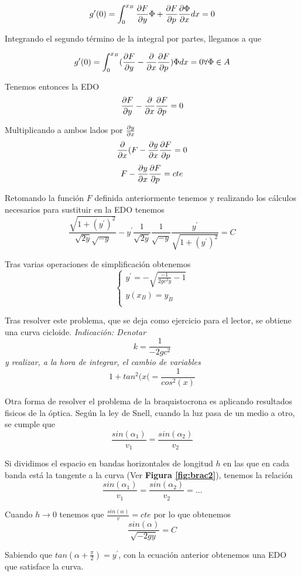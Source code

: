 \begin{example}[(Braquistocrona I)]
$$g^\prime(0) = \int_0^{x_B} \partialder{y}{F}\Phi + \partialder{p}{F}\partialder{x}{\Phi}dx = 0$$

Integrando el segundo término de la integral por partes, llegamos a que

$$g^\prime(0) = \int_0^{x_B} (\partialder{y}{F}-\derivative{x}\partialder{p}{F})\Phi dx = 0 \forall \Phi\in A$$

Tenemos entonces la EDO
$$\partialder{y}{F}-\derivative{x}\partialder{p}{F} = 0$$

Multiplicando a ambos lados por $\partialder{x}{y}$
$$\derivative{x}(F-\partialder{x}{y}\partialder{p}{F} = 0$$
$$F-\partialder{x}{y}\partialder{p}{F} = cte$$

Retomando la función $F$ definida anteriormente tenemos y realizando los cálculos necesarios para sustituir en la EDO tenemos
$$\frac{\sqrt{1+(y^\prime)^2}}{\sqrt{2y}\sqrt{-y}}-y^\prime\frac{1}{\sqrt{2y}}\frac{1}{\sqrt{-y}}\frac{y^\prime}{\sqrt{1+(y^\prime)^2}}=C$$

Tras varias operaciones de simplificación obtenemos
\begin{equation*}
  \left\lbrace
  \begin{array}{l}
     y^\prime=-\sqrt{\frac{-1}{2gc^2y}-1}\\
	 y(x_B)=y_B\\
  \end{array}
  \right.
\end{equation*}

Tras resolver este problema, que se deja como ejercicio para el lector, se obtiene una curva cicloide.
\vspace{5mm}
\textit{Indicación: Denotar} $$k = \frac{1}{-2gc^2}$$ \textit{y realizar, a la hora de integrar, el cambio de variables} $$1+tan^2(x(=\frac{1}{cos^2(x)}$$
\end{example}


\begin{example}[(Braquistocrona II)]
Otra forma de resolver el problema de la braquistocrona es aplicando resultados fisicos de la óptica.
Según la ley de Snell, cuando la luz pasa de un medio a otro, se cumple que
$$\frac{sin(\alpha_1)}{v_1} = \frac{sin(\alpha_2)}{v_2}$$

Si dividimos el espacio en bandas horizontales de longitud $h$ en las que en cada banda está la tangente a la curva (Ver \textbf{Figura \ref{fig:brac2}}), tenemos la relación
$$\frac{sin(\alpha_1)}{v_1} = \frac{sin(\alpha_2)}{v_2} = \hdots$$

Cuando $h\to 0$ tenemos que $\frac{sin(\alpha)}{v} = cte$ por lo que obtenemos
$$\frac{sin(\alpha)}{\sqrt{-2gy}}=C$$

Sabiendo que $tan(\alpha+\frac{\pi}{2}) = y^\prime$, con la ecuación anterior obtenemos una EDO que satisface la curva.
\end{example}